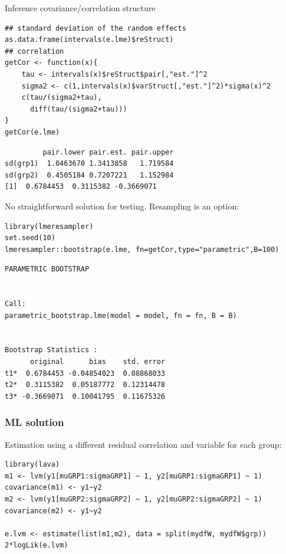 \documentclass{article}
\begin{document}
Inference covariance/correlation structure
\lstset{language=r,label= ,caption= ,captionpos=b,numbers=none}
\begin{lstlisting}
## standard deviation of the random effects
as.data.frame(intervals(e.lme)$reStruct)
## correlation
getCor <- function(x){
    tau <- intervals(x)$reStruct$pair[,"est."]^2
    sigma2 <- c(1,intervals(x)$varStruct[,"est."]^2)*sigma(x)^2
    c(tau/(sigma2+tau),
      diff(tau/(sigma2+tau)))
}
getCor(e.lme)
\end{lstlisting}

\begin{verbatim}
         pair.lower pair.est. pair.upper
sd(grp1)  1.0463670 1.3413858   1.719584
sd(grp2)  0.4505184 0.7207221   1.152984
[1]  0.6784453  0.3115382 -0.3669071
\end{verbatim}

No straightforward solution for testing. Resampling is an option:
\lstset{language=r,label= ,caption= ,captionpos=b,numbers=none}
\begin{lstlisting}
library(lmeresampler)
set.seed(10)
lmeresampler::bootstrap(e.lme, fn=getCor,type="parametric",B=100)
\end{lstlisting}

\begin{verbatim}
PARAMETRIC BOOTSTRAP


Call:
parametric_bootstrap.lme(model = model, fn = fn, B = B)


Bootstrap Statistics :
      original      bias    std. error
t1*  0.6784453 -0.04854023  0.08868033
t2*  0.3115382  0.05187772  0.12314478
t3* -0.3669071  0.10041795  0.11675326
\end{verbatim}

\clearpage

\subsubsection{ML solution}
\label{sec:orgefba32e}
Estimation using a different residual correlation and variable for each group:
\lstset{language=r,label= ,caption= ,captionpos=b,numbers=none}
\begin{lstlisting}
library(lava)
m1 <- lvm(y1[muGRP1:sigmaGRP1] ~ 1, y2[muGRP1:sigmaGRP1] ~ 1)
covariance(m1) <- y1~y2
m2 <- lvm(y1[muGRP2:sigmaGRP2] ~ 1, y2[muGRP2:sigmaGRP2] ~ 1)
covariance(m2) <- y1~y2

e.lvm <- estimate(list(m1,m2), data = split(mydfW, mydfW$grp))
2*logLik(e.lvm)
\end{lstlisting}
\end{document}

